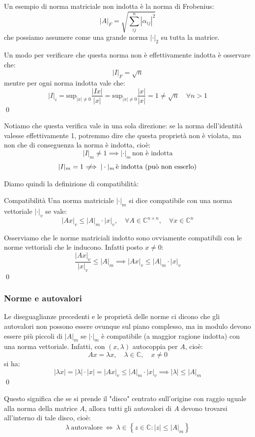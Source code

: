 \documentclass[a4paper,11pt]{article}
\begin{document}
Un esempio di norma matriciale non indotta è la norma di Frobenius:
$$
|A|_F = \sqrt{\sum_{ij}^n |\alpha_{ij}|^2}
$$
che possiamo assumere come una grande norma $|\cdot|_2$ su tutta la matrice.

Un modo per verificare che questa norma non è effettivamente indotta è osservare che:
$$
|I|_F = \sqrt{n}
$$
mentre per ogni norma indotta vale che:
$$
|I|_i = \mathrm{sup}_{|x| \neq 0} \frac{|Ix|}{|x|} = \mathrm{sup}_{|x| \neq 0} \frac{|x|}{|x|} = 1 \neq \sqrt{n}  \quad \forall n > 1
$$ \qed

Notiamo che questa verifica vale in una sola direzione: se la norma dell'identità valesse effettivamente 1, potremmo dire che questa proprietà non è violata, ma non che di conseguenza la norma è indotta, cioè:
$$
|I|_m \neq 1 \implies |\cdot|_m \, \text{non è indotta}
$$
$$
|I|_m = 1 \;\not\!\!\!\implies |\cdot|_m \, \text{è indotta (può non esserlo)}
$$

Diamo quindi la definizione di compatibilità:
\begin{definition}{Compatibilità}
	Una norma matriciale $|\cdot|_m$ si dice compatibile con una norma vettoriale $|\cdot|_v$ se vale:
	$$
	|Ax|_v \leq |A|_m \cdot |x|_v, \quad \forall A \in \mathbb{C}^{n \times n}, \quad \forall{x} \in \mathbb{C}^n
	$$
\end{definition}

Osserviamo che le norme matriciali indotto sono ovviamente compatibili con le norme vettoriali che le inducono.
Infatti posto $x \neq 0$:
$$
\frac{|Ax|_v}{|x|_v} \leq |A|_m \implies |Ax|_v \leq |A|_m \cdot |x|_v
$$ \qed

\subsubsection{Norme e autovalori}
Le diseguaglianze precedenti e le proprietà delle norme ci dicono che gli autovalori non possono essere ovunque sul piano complesso, ma in modulo devono essere più piccoli di $|A|_m$ se $|\cdot|_m$ è compatibile (a maggior ragione indotta) con una norma vettoriale.
Infatti, con $(x, \lambda)$ autocoppia per $A$, cioè:
$$
Ax = \lambda x, \quad \lambda \in \mathbb{C}, \quad x \neq 0
$$
si ha:
$$
|\lambda x| = |\lambda| \cdot |x| = |A x|_v \leq |A|_m \cdot |x|_v \implies |\lambda| \leq |A|_m
$$ \qed

Questo significa che se si prende il "disco" centrato sull'origine con raggio uguale alla norma della matrice $A$, allora tutti gli autovalori di $A$ devono trovarsi all'interno di tale disco, cioè:
$$
\lambda \ \text{autovalore} \ \Leftrightarrow \ \lambda \in \left\{ z \in \mathbb{C} : |z| \leq |A|_m \right\}
$$
\end{document}
